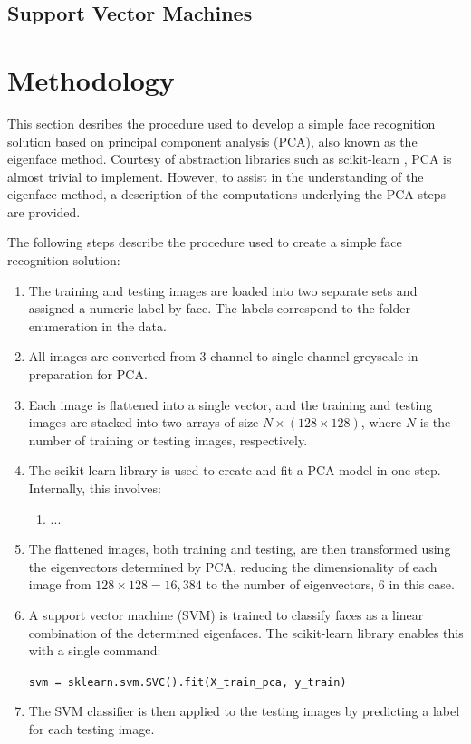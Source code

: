 \subsection{Support Vector Machines}

\section{Methodology}

This section desribes the procedure used to develop a simple face recognition solution based on principal component analysis (PCA), also known as the eigenface method. Courtesy of abstraction libraries such as scikit-learn \cite{scikitlearn_2023}, PCA is almost trivial to implement. However, to assist in the understanding of the eigenface method, a description of the computations underlying the PCA steps are provided.

The following steps describe the procedure used to create a simple face recognition solution:

\begin{enumerate}
  \item The training and testing images are loaded into two separate sets and assigned a numeric label by face. The labels correspond to the folder enumeration in the data.

  \item All images are converted from 3-channel to single-channel greyscale in preparation for PCA.

  \item Each image is flattened into a single vector, and the training and testing images are stacked into two arrays of size $N\times(128\times128)$, where $N$ is the number of training or testing images, respectively.

  \item The scikit-learn library is used to create and fit a PCA model in one step. Internally, this involves:

  \begin{enumerate}
    \item ...

  \end{enumerate}

  \item The flattened images, both training and testing, are then transformed using the eigenvectors determined by PCA, reducing the dimensionality of each image from $128\times128=16,384$ to the number of eigenvectors, 6 in this case.

  \item A support vector machine (SVM) is trained to classify faces as a linear combination of the determined eigenfaces. The scikit-learn library enables this with a single command:

  \begin{center}
    \texttt{svm = sklearn.svm.SVC().fit(X\_train\_pca, y\_train)}
  \end{center}

  \item The SVM classifier is then applied to the testing images by predicting a label for each testing image.

\end{enumerate}

